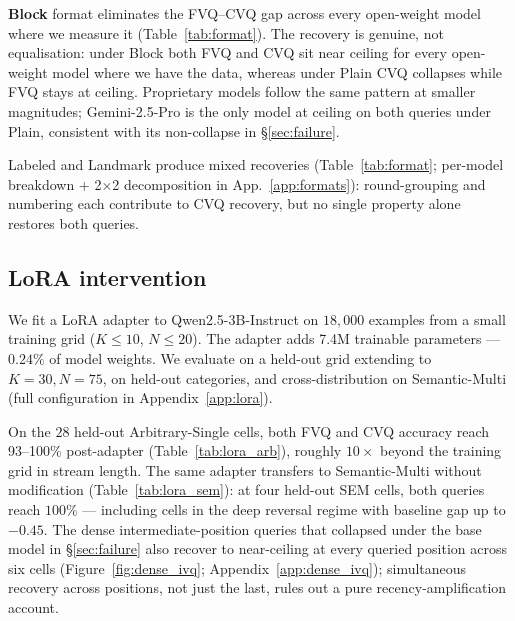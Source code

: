 \documentclass[11pt]{article}
\begin{document}
\begin{table}[t]
\centering
\small

\caption{Format-intervention results on Semantic-Multi
($K{=}10, N{=}50$). Each cell shows \textbf{FVQ / CVQ accuracy};
gap $\Delta = $ FVQ $-$ CVQ. Plain is the default condition from
\S\ref{sec:failure}. Wilson half-widths in
Appendix~\ref{app:formats}, Table~\ref{tab:format_ci}.}
\label{tab:format}
\end{table}

\textbf{Block} format eliminates the FVQ--CVQ gap across every
open-weight model where we measure it (Table~\ref{tab:format}).
The recovery is genuine, not equalisation: under Block both FVQ and
CVQ sit near ceiling for every open-weight model where we have the
data, whereas under Plain CVQ collapses while FVQ stays at ceiling.
Proprietary models follow the same pattern at smaller magnitudes;
Gemini-2.5-Pro is the only model at ceiling on both queries under
Plain, consistent with its non-collapse in \S\ref{sec:failure}.

Labeled and Landmark produce mixed recoveries
(Table~\ref{tab:format}; per-model breakdown + 2×2 decomposition in
App.~\ref{app:formats}): round-grouping and numbering each
contribute to CVQ recovery, but no single property alone restores
both queries.

\subsection{LoRA intervention}
\label{sec:recoveries:lora}

We fit a LoRA adapter \citep{hu2021lora} to Qwen2.5-3B-Instruct on
$18{,}000$ examples from a small training grid ($K \le 10$,
$N \le 20$). The adapter adds 7.4M trainable parameters ---
$0.24\%$ of model weights. We evaluate on a held-out grid extending
to $K{=}30, N{=}75$, on held-out categories, and cross-distribution
on Semantic-Multi (full configuration in Appendix~\ref{app:lora}).

On the $28$ held-out Arbitrary-Single cells, both FVQ and CVQ
accuracy reach 93--100\% post-adapter (Table~\ref{tab:lora_arb}),
roughly $10\times$ beyond the training grid in stream length.
The same adapter transfers to Semantic-Multi without modification
(Table~\ref{tab:lora_sem}): at four held-out SEM cells, both
queries reach $100\%$ --- including cells in the deep reversal
regime with baseline gap up to $-0.45$.
The dense intermediate-position queries that collapsed under the
base model in \S\ref{sec:failure} also recover to near-ceiling at
every queried position across six cells (Figure~\ref{fig:dense_ivq};
Appendix~\ref{app:dense_ivq}); simultaneous recovery across
positions, not just the last, rules out a pure
recency-amplification account.
\end{document}
